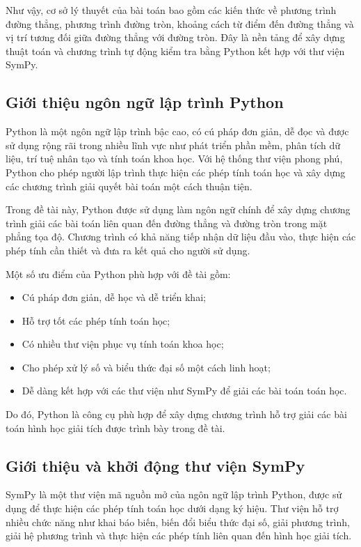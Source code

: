 \documentclass[12pt,a4paper]{article}
\begin{document}
Như vậy, cơ sở lý thuyết của bài toán bao gồm các kiến thức về phương trình đường thẳng, phương trình đường tròn, khoảng cách từ điểm đến đường thẳng và vị trí tương đối giữa đường thẳng với đường tròn. Đây là nền tảng để xây dựng thuật toán và chương trình tự động kiểm tra bằng Python kết hợp với thư viện SymPy.

\subsection{Giới thiệu ngôn ngữ lập trình Python}

Python là một ngôn ngữ lập trình bậc cao, có cú pháp đơn giản, dễ đọc và được sử dụng rộng rãi trong nhiều lĩnh vực như phát triển phần mềm, phân tích dữ liệu, trí tuệ nhân tạo và tính toán khoa học. Với hệ thống thư viện phong phú, Python cho phép người lập trình thực hiện các phép tính toán học và xây dựng các chương trình giải quyết bài toán một cách thuận tiện.

Trong đề tài này, Python được sử dụng làm ngôn ngữ chính để xây dựng chương trình giải các bài toán liên quan đến đường thẳng và đường tròn trong mặt phẳng tọa độ. Chương trình có khả năng tiếp nhận dữ liệu đầu vào, thực hiện các phép tính cần thiết và đưa ra kết quả cho người sử dụng.

Một số ưu điểm của Python phù hợp với đề tài gồm:
\begin{itemize}
    \item Cú pháp đơn giản, dễ học và dễ triển khai;
    \item Hỗ trợ tốt các phép tính toán học;
    \item Có nhiều thư viện phục vụ tính toán khoa học;
    \item Cho phép xử lý số và biểu thức đại số một cách linh hoạt;
    \item Dễ dàng kết hợp với các thư viện như SymPy để giải các bài toán toán học.
\end{itemize}

Do đó, Python là công cụ phù hợp để xây dựng chương trình hỗ trợ giải các bài toán hình học giải tích được trình bày trong đề tài.

\subsection{Giới thiệu và khởi động thư viện SymPy}

SymPy là một thư viện mã nguồn mở của ngôn ngữ lập trình Python, được sử dụng để thực hiện các phép tính toán học dưới dạng ký hiệu. Thư viện hỗ trợ nhiều chức năng như khai báo biến, biến đổi biểu thức đại số, giải phương trình, giải hệ phương trình và thực hiện các phép tính liên quan đến hình học giải tích.
\end{document}
